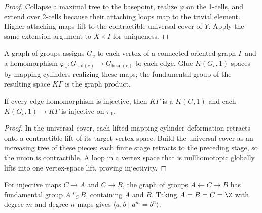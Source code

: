 \begin{proof}
\sketch Collapse a maximal tree to the basepoint, realize $\varphi$ on the
1-cells, and extend over 2-cells because their attaching loops map to the
trivial element. Higher attaching maps lift to the contractible universal
cover of $Y$. Apply the same extension argument to $X\times I$ for uniqueness.
\end{proof}

\begin{definition}
\label{def:graph-of-groups}
\leanok
{}
A graph of groups assigns $G_v$ to each vertex of a connected oriented graph
$\Gamma$ and a homomorphism $\varphi_e:G_{\mathrm{tail}(e)}\to
G_{\mathrm{head}(e)}$ to each edge. Glue $K(G_v,1)$ spaces by mapping
cylinders realizing these maps; the fundamental group of the resulting space
$K\Gamma$ is the graph product.
\end{definition}

\begin{theorem}
\label{thm:graph-of-groups-is-kg1}
If every edge homomorphism is injective, then $K\Gamma$ is a $K(G,1)$ and each
$K(G_v,1)\to K\Gamma$ is injective on $\pi_1$.
\end{theorem}

\begin{proof}
\sketch In the universal cover, each lifted mapping cylinder deformation
retracts onto a contractible lift of its target vertex space. Build the
universal cover as an increasing tree of these pieces; each finite stage
retracts to the preceding stage, so the union is contractible. A loop in a
vertex space that is nullhomotopic globally lifts into one vertex-space lift,
proving injectivity.
\end{proof}

\begin{example}
\label{ex:free-product-with-amalgamation}
For injective maps $C\to A$ and $C\to B$, the graph of groups
$A\leftarrow C\to B$ has fundamental group $A*_C B$, containing $A$ and
$B$. Taking $A=B=C=\Z$ with degree-$m$ and degree-$n$ maps gives
$\langle a,b\mid a^m=b^n\rangle$.
\end{example}

